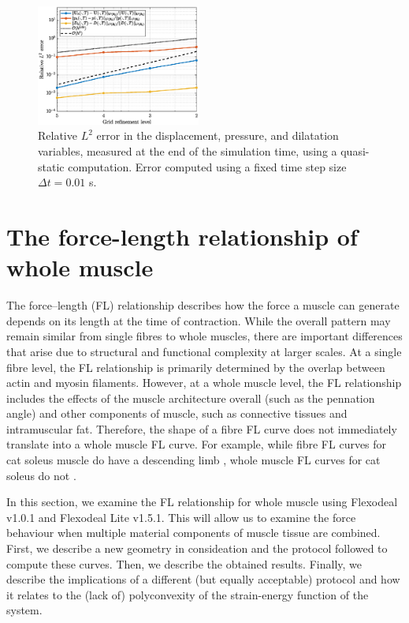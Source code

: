 \documentclass{sfuthesis}
\numberwithin{equation}{section}
\numberwithin{figure}{chapter}
\numberwithin{table}{chapter}
\theoremstyle{definition}
\begin{document}
\begin{figure}
    \centering
    \includegraphics[width=0.48\textwidth]{convergence-study-quasi-static.eps}
    \caption{Relative $L^2$ error in the displacement, pressure, and dilatation variables, measured at the end of the simulation time, using a quasi-static computation. Error computed using a fixed time step size $\Delta t = 0.01$ \unit{s}.\label{fig:convergence_quasistatic}}
\end{figure}



\section{The force-length relationship of whole muscle} \label{sec:flexodeal_fl_curves}

The force–length (FL) relationship describes how the force a muscle can generate depends on its length at the time of contraction. While the overall pattern may remain similar from single fibres to whole muscles, there are important differences that arise due to structural and functional complexity at larger scales. At a single fibre level, the FL relationship is primarily determined by the overlap between actin and myosin filaments. However, at a whole muscle level, the FL relationship includes the effects of the muscle architecture overall (such as the pennation angle) and other components of muscle, such as connective tissues and intramuscular fat. Therefore, the shape of a fibre FL curve does not immediately translate into a whole muscle FL curve. For example, while fibre FL curves for cat soleus muscle do have a descending limb \cite{ScottBrownLoeb1996-1,VazDeLaRocha2012}, whole muscle FL curves for cat soleus do not \cite{Gareis1992}.

In this section, we examine the FL relationship for whole muscle using Flexodeal v1.0.1 and Flexodeal Lite v1.5.1. This will allow us to examine the force behaviour when multiple material components of muscle tissue are combined. First, we describe a new geometry in consideation and the protocol followed to compute these curves. Then, we describe the obtained results. Finally, we describe the implications of a different (but equally acceptable) protocol and how it relates to the (lack of) polyconvexity of the strain-energy function of the system.
\end{document}
